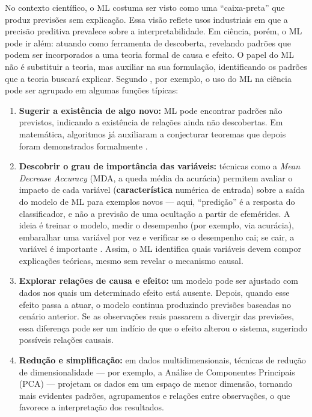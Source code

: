 No contexto científico, o ML costuma ser visto como uma ``caixa-preta'' que produz previsões sem explicação. Essa visão reflete usos industriais em que a precisão preditiva prevalece sobre a interpretabilidade. Em ciência, porém, o ML pode ir além: atuando como ferramenta de descoberta, revelando padrões que podem ser incorporados a uma teoria formal de causa e efeito. O papel do ML não é substituir a teoria, mas auxiliar na sua formulação, identificando os padrões que a teoria buscará explicar. Segundo \cite{lopez2020ml}, por exemplo, o uso do ML na ciência pode ser agrupado em algumas funções típicas:

\begin{enumerate}
	\item[(i)] \textbf{Sugerir a existência de algo novo:} ML pode encontrar padrões não previstos, indicando a existência de relações ainda não descobertas. Em matemática, algoritmos já auxiliaram a conjecturar teoremas que depois foram demonstrados formalmente \citep{gryak2018conjugacy}.

	\item[(ii)] \textbf{Descobrir o grau de importância das variáveis:} técnicas como a \textit{Mean Decrease Accuracy} (MDA, a queda média da acurácia) permitem avaliar o impacto de cada variável (\textbf{característica} numérica de entrada) sobre a saída do modelo de ML para exemplos novos --- aqui, ``predição'' é a resposta do classificador, e não a previsão de uma ocultação a partir de efemérides. A ideia é treinar o modelo, medir o desempenho (por exemplo, via acurácia), embaralhar uma variável por vez e verificar se o desempenho cai; se cair, a variável é importante \citep{liu2004comparative}. Assim, o ML identifica quais variáveis devem compor explicações teóricas, mesmo sem revelar o mecanismo causal.

	\item[(iii)] \textbf{Explorar relações de causa e efeito:} um modelo pode ser ajustado com dados nos quais um determinado efeito está ausente. Depois, quando esse efeito passa a atuar, o modelo continua produzindo previsões baseadas no cenário anterior. Se as observações reais passarem a divergir das previsões, essa diferença pode ser um indício de que o efeito alterou o sistema, sugerindo possíveis relações causais.

	\item[(iv)] \textbf{Redução e simplificação:} em dados multidimensionais, técnicas de redução de dimensionalidade --- por exemplo, a Análise de Componentes Principais (PCA) --- projetam os dados em um espaço de menor dimensão, tornando mais evidentes padrões, agrupamentos e relações entre observações, o que favorece a interpretação dos resultados.


\end{enumerate}
